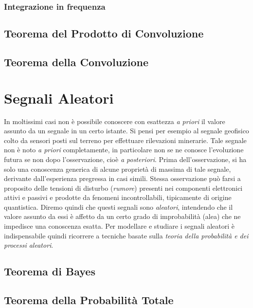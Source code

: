 \documentclass[12pt,oneside,openany]{memoir}
\numberwithin{equation}{subsection}
\begin{document}
\subsubsection{Integrazione in frequenza}

\newpage
\subsection{Teorema del Prodotto di Convoluzione}

\newpage
\subsection{Teorema della Convoluzione}

\newpage	
\section{Segnali Aleatori}
In moltissimi casi non \`e possibile conoscere con esattezza \textit{a priori} il valore assunto da un segnale in un certo istante. Si pensi per esempio al segnale geofisico colto da sensori posti sul terreno per effettuare rilevazioni minerarie. Tale segnale non \`e noto \textit{a priori} completamente, in particolare non se ne conosce l'evoluzione futura se non dopo l'osservazione, cio\`e \textit{a posteriori}. Prima dell'osservazione, si ha solo una conoscenza generica di alcune propriet\`a di massima di tale segnale, derivante dall'esperienza pregressa in casi simili. Stessa osservazione pu\`o farsi a proposito delle tensioni di disturbo (\textit{rumore}) presenti nei componenti elettronici attivi e passivi e prodotte da fenomeni incontrollabili, tipicamente di origine quantistica. Diremo quindi che questi segnali sono \textit{aleatori}, intendendo che il valore assunto da essi \`e affetto da un certo grado di improbabilit\`a (alea) che ne impedisce una conoscenza esatta. 
Per modellare e studiare i segnali aleatori \`e indispensabile quindi ricorrere a tecniche basate sulla \textit{teoria della probabilit\`a e dei processi aleatori}.

\newpage
\subsection{Teorema di Bayes}

\newpage
\subsection{Teorema della Probabilit\`a Totale}
\end{document}
